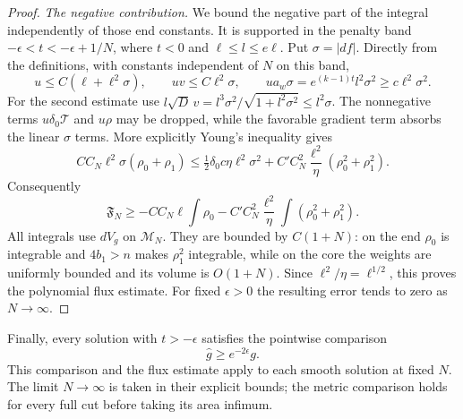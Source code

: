 \begin{proof}
\emph{The negative contribution.} We bound the negative part of
the integral independently of those end constants.  It is supported
in the penalty band
$-\epsilon<t<-\epsilon+1/N$, where $t<0$ and
$\ell\leq l\leq e\ell$.  Put $\sigma=|df|$.  Directly from the
definitions, with constants independent of $N$ on this band,
\begin{equation}
 u\leq C(\ell+\ell^2\sigma),\qquad
 uv\leq C\ell^2\sigma,\qquad
 ua_w\sigma=e^{(k-1)t}l^2\sigma^2\geq c\ell^2\sigma^2.
 \label{eq:scalar:penalty-weights}
\end{equation}
For the second estimate use
$l\sqrt D\,v=l^3\sigma^2/\sqrt{1+l^2\sigma^2}\leq l^2\sigma$.
The nonnegative terms $u\delta_0\mathcal T$ and $u\rho$ may be
dropped, while the favorable gradient term absorbs the linear
$\sigma$ terms.  More explicitly Young's inequality gives
\[
 C C_N\ell^2\sigma(\rho_0+\rho_1)
 \leq\tfrac12\delta_0c\eta\ell^2\sigma^2
       +C' C_N^2\frac{\ell^2}{\eta}(\rho_0^2+\rho_1^2).
\]
Consequently
\[
 \mathfrak F_N\geq
  -C C_N\ell\int\rho_0
  -C' C_N^2\frac{\ell^2}{\eta}\int(\rho_0^2+\rho_1^2).
\]
All integrals use $dV_g$ on $\mathcal M_N$.  They are bounded by
$C(1+N)$: on the end $\rho_0$ is integrable and $4b_1>n$ makes
$\rho_1^2$ integrable, while on the core the weights are uniformly
bounded and its volume is $O(1+N)$.  Since
$\ell^2/\eta=\ell^{1/2}$, this proves the polynomial flux estimate.
For fixed $\epsilon>0$ the resulting error tends to zero as
$N\to\infty$.
\end{proof}

Finally, every solution with $t>-\epsilon$ satisfies the pointwise comparison
\begin{equation}
 \widehat g\geq e^{-2\epsilon}g.
 \label{eq:scalar:metric-domination}
\end{equation}
This comparison and the flux estimate apply to each smooth solution at
fixed $N$.  The limit $N\to\infty$ is taken in their explicit bounds;
the metric comparison holds for every full cut before taking its area
infimum.
